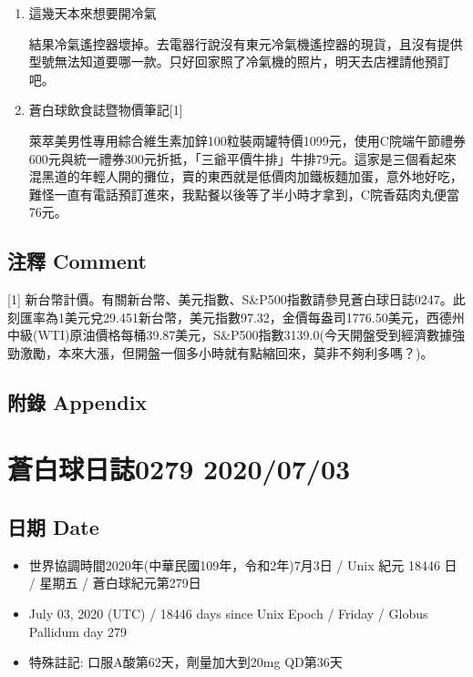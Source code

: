 \documentclass[a5paper, 11pt
]{book}
\providecommand{\tightlist}{%
  \setlength{\itemsep}{0pt}\setlength{\parskip}{0pt}}
\begin{document}
\begin{enumerate}
\def\labelenumi{\arabic{enumi}.}
\item
  這幾天本來想要開冷氣

  結果冷氣遙控器壞掉。去電器行說沒有東元冷氣機遙控器的現貨，且沒有提供型號無法知道要哪一款。只好回家照了冷氣機的照片，明天去店裡請他預訂吧。
\item
  蒼白球飲食誌暨物價筆記{[}1{]}

  萊萃美男性專用綜合維生素加鋅100粒裝兩罐特價1099元，使用C院端午節禮券600元與統一禮券300元折抵，「三爺平價牛排」牛排79元。這家是三個看起來混黑道的年輕人開的攤位，賣的東西就是低價肉加鐵板麵加蛋，意外地好吃，難怪一直有電話預訂進來，我點餐以後等了半小時才拿到，C院香菇肉丸便當76元。
\end{enumerate}

\hypertarget{ux6ce8ux91cb-comment-27}{%
\subsection{注釋 Comment}\label{ux6ce8ux91cb-comment-27}}

{[}1{]}
新台幣計價。有關新台幣、美元指數、S\&P500指數請參見蒼白球日誌0247。此刻匯率為1美元兌29.451新台幣，美元指數97.32，金價每盎司1776.50美元，西德州中級(WTI)原油價格每桶39.87美元，S\&P500指數3139.0(今天開盤受到經濟數據強勁激勵，本來大漲，但開盤一個多小時就有點縮回來，莫非不夠利多嗎？)。

\hypertarget{ux9644ux9304-appendix-27}{%
\subsection{附錄 Appendix}\label{ux9644ux9304-appendix-27}}

\hypertarget{ux84bcux767dux7403ux65e5ux8a8c0279-20200703}{%
\section{蒼白球日誌0279
2020/07/03}\label{ux84bcux767dux7403ux65e5ux8a8c0279-20200703}}

\hypertarget{ux65e5ux671f-date-28}{%
\subsection{日期 Date}\label{ux65e5ux671f-date-28}}

\begin{itemize}
\tightlist
\item
  世界協調時間2020年(中華民國109年，令和2年)7月3日 / Unix 紀元 18446 日
  / 星期五 / 蒼白球紀元第279日
\item
  July 03, 2020 (UTC) / 18446 days since Unix Epoch / Friday / Globus
  Pallidum day 279
\item
  特殊註記: 口服A酸第62天，劑量加大到20mg QD第36天
\end{itemize}
\end{document}
